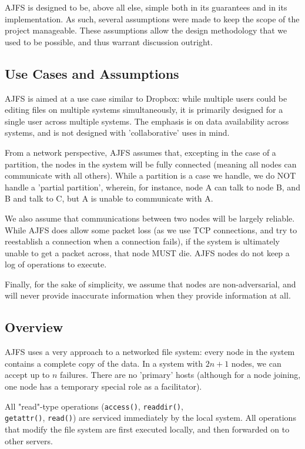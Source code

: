 

AJFS is designed to be, above all else, simple both in its guarantees and in its
implementation. As such, several assumptions were made to keep the scope of the
project manageable. These assumptions allow the design methodology that we used
to be possible, and thus warrant discussion outright.

\subsection{Use Cases and Assumptions}

AJFS is aimed at a use case similar to Dropbox: while multiple users could be
editing files on multiple systems simultaneously, it is primarily designed for a
single user across multiple systems. The emphasis is on data availability across
systems, and is not designed with 'collaborative' uses in mind.

From a network perspective, AJFS assumes that, excepting in the case of a
partition, the nodes in the system will be fully connected (meaning all nodes
can communicate with all others). While a partition is a case we handle, we do
NOT handle a 'partial partition', wherein, for instance, node A can talk to node
B, and B and talk to C, but A is unable to communicate with A.

We also assume that communications between two nodes will be largely reliable.
While AJFS does allow some packet loss (as we use TCP connections, and try to
reestablish a connection when a connection fails), if the system is ultimately
unable to get a packet across, that node MUST die. AJFS nodes do not keep a
log of operations to execute.

Finally, for the sake of simplicity, we assume that nodes are non-adversarial,
and will never provide inaccurate information when they provide information at
all.

\subsection{Overview}

AJFS uses a very approach to a networked file system: every node in the system
contains a complete copy of the data. In a system with $2n + 1$ nodes, we can
accept up to $n$ failures. There are no 'primary' hosts (although for a node
joining, one node has a temporary special role as a facilitator).

All "read"-type operations (\texttt{access()}, \texttt{readdir()},\\ 
\texttt{getattr()}, \texttt{read()}) are serviced immediately by the local
system. All operations that modify the file system are first executed locally,
and then forwarded on to other servers.

